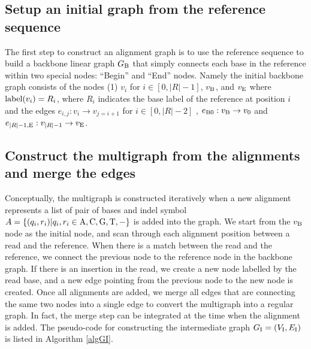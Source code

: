 \documentclass[11pt]{article}
\begin{document}
\subsection{Setup an initial graph from the reference sequence}

The first step to construct an alignment graph is to use the reference sequence to build a backbone linear graph $G_{\rm B}$ that simply connects each base in the reference within two special nodes: ``Begin'' and ``End'' nodes. Namely the initial backbone graph consists of the nodes (1) $v_i$ for $i \in [0, |R| -1]$, $v_{\rm B}$, and $v_{\rm E}$ where
${\rm label}(v_i) = R_i$, where  $R_i$ indicates the base label of the reference at position $i$ and the edges $e_{i,j} : v_i \rightarrow v_{j=i+1}$ for $i \in [0, |R|-2]$ , $e_{{\rm B} 0}: v_{\rm B} \rightarrow v_0$ and $e_{{|R|-1},{\rm E}}: v_{|R|-1} \rightarrow v_{\rm E}$.  

\subsection{Construct the multigraph from the alignments and merge the edges}

Conceptually, the multigraph is constructed iteratively when a new alignment represents a list of pair of bases and indel symbol $A = \{(q_i, r_i)| q_i,r_i \in {\rm A,C,G,T,-}\}$ is added into the graph. We start from the $v_{\rm B}$ node as the initial node, and scan through each alignment position between a read and the reference. When there is a match between the read and the reference, we connect the previous node to the reference node in the backbone graph. If there is an insertion in the read, we create a new node labelled by the read base, and a new edge pointing from the previous node to the new node is created.  Once all alignments are added, we merge all edges that are connecting the same two nodes into a single edge to convert the multigraph into a regular graph.  In fact, the merge step can be integrated at the time when the alignment is added. The pseudo-code for constructing the intermediate graph $G_{\rm I} = (V_{\rm I}, E_{\rm I})$ is listed in Algorithm \ref{algGI}.
\end{document}
